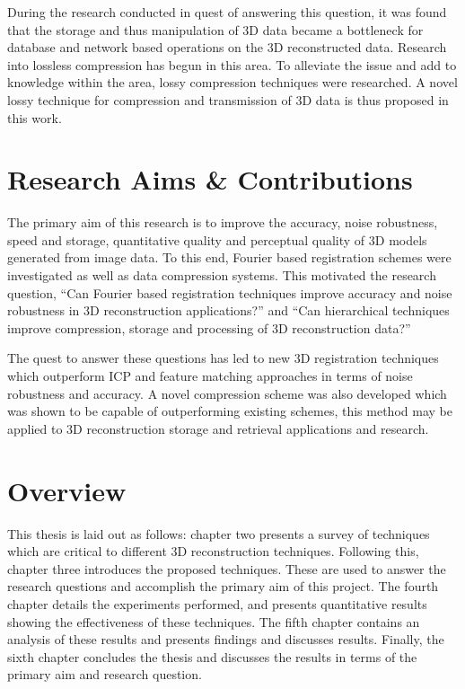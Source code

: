 During the research conducted in quest of answering this question, it was found that the storage and thus manipulation of 3D data became a bottleneck for database and network based operations on the 3D reconstructed data. Research into lossless compression has begun in this area. To alleviate the issue and add to knowledge within the area, lossy compression techniques were researched. A novel lossy technique for compression and transmission of 3D data is thus proposed in this work.  \\

\section{Research Aims \& Contributions}

The primary aim of this research is to improve the accuracy, noise robustness, speed and storage, quantitative quality and perceptual quality of 3D models generated from image data. To this end, Fourier based registration schemes were investigated as well as data compression systems. This motivated the research question, ``Can Fourier based registration techniques improve accuracy and noise robustness in 3D reconstruction applications?'' and ``Can hierarchical techniques improve compression, storage and processing of 3D reconstruction data?'' 

The quest to answer these questions has led to new 3D registration techniques \cite{Lincoln16Fourier,Lincoln16Dense,Lincoln16Monocular} which outperform ICP and feature matching approaches in terms of noise robustness and accuracy. A novel compression scheme was also developed \cite{Lincoln13Interpolating,Lincoln15Plane} which was shown to be capable of outperforming existing schemes, this method may be applied to 3D reconstruction storage and retrieval applications and research.

\section{Overview}

This thesis is laid out as follows: chapter two presents a survey of techniques which are critical to different 3D reconstruction techniques. Following this, chapter three introduces the proposed techniques. These are used to answer the research questions and accomplish the primary aim of this project. The fourth chapter details the experiments performed, and presents quantitative results showing the effectiveness of these techniques. The fifth chapter contains an analysis of these results and presents findings and discusses results. Finally, the sixth chapter concludes the thesis and discusses the results in terms of the primary aim and research question. 


